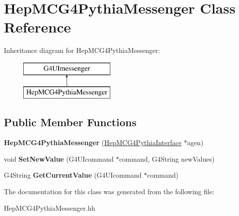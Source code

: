 \hypertarget{class_hep_m_c_g4_pythia_messenger}{}\section{Hep\+M\+C\+G4\+Pythia\+Messenger Class Reference}
\label{class_hep_m_c_g4_pythia_messenger}
Inheritance diagram for Hep\+M\+C\+G4\+Pythia\+Messenger\+:\begin{figure}[H]
\begin{center}
\leavevmode
\includegraphics[height=2.000000cm]{class_hep_m_c_g4_pythia_messenger}
\end{center}
\end{figure}
\subsection*{Public Member Functions}
\begin{DoxyCompactItemize}
\item 
\hypertarget{class_hep_m_c_g4_pythia_messenger_a58ebd7ec73e23a7a7e1001e64a5f6720}{}{\bfseries Hep\+M\+C\+G4\+Pythia\+Messenger} (\hyperlink{class_hep_m_c_g4_pythia_interface}{Hep\+M\+C\+G4\+Pythia\+Interface} $\ast$agen)\label{class_hep_m_c_g4_pythia_messenger_a58ebd7ec73e23a7a7e1001e64a5f6720}

\item 
\hypertarget{class_hep_m_c_g4_pythia_messenger_a5956a14ab047c10b65de9317389f8b57}{}void {\bfseries Set\+New\+Value} (G4\+U\+Icommand $\ast$command, G4\+String new\+Values)\label{class_hep_m_c_g4_pythia_messenger_a5956a14ab047c10b65de9317389f8b57}

\item 
\hypertarget{class_hep_m_c_g4_pythia_messenger_aa38cadfb3089bcaf970a515546daeff6}{}G4\+String {\bfseries Get\+Current\+Value} (G4\+U\+Icommand $\ast$command)\label{class_hep_m_c_g4_pythia_messenger_aa38cadfb3089bcaf970a515546daeff6}

\end{DoxyCompactItemize}


The documentation for this class was generated from the following file\+:\begin{DoxyCompactItemize}
\item 
Hep\+M\+C\+G4\+Pythia\+Messenger.\+hh\end{DoxyCompactItemize}
